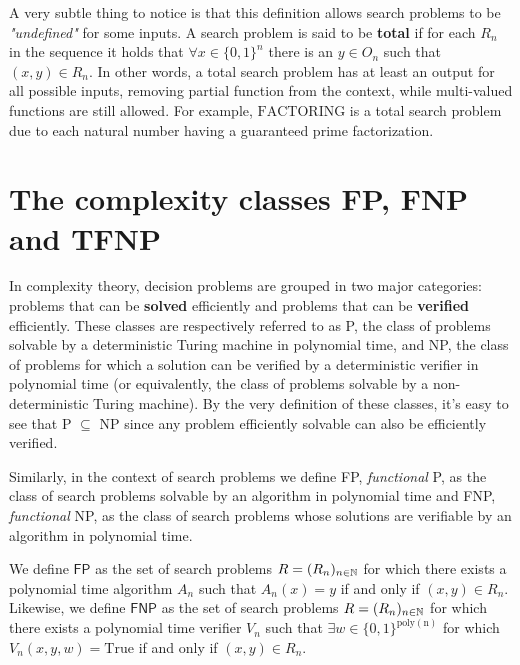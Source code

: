 A very subtle thing to notice is that this definition allows search problems to be \textit{"undefined"} for some inputs. A search problem is said to be \textbf{total} if for each $R_n$ in the sequence it holds that $\forall x \in \{0,1\}^n$ there is an $y \in O_n$ such that $(x,y) \in R_n$. In other words, a total search problem has at least an output for all possible inputs, removing partial function from the context, while multi-valued functions are still allowed. For example, $\mathrm{FACTORING}$ is a total search problem due to each natural number having a guaranteed prime factorization.

\newpage

\section{The complexity classes \textsf{FP}, \textsf{FNP} and \textsf{TFNP}}

In complexity theory, decision problems are grouped in two major categories: problems that can be \textbf{solved} efficiently and problems that can be \textbf{verified} efficiently. These classes are respectively referred to as \textsf{P}, the class of problems solvable by a deterministic Turing machine in polynomial time, and \textsf{NP}, the class of problems for which a solution can be  verified  by a deterministic verifier in polynomial time (or equivalently, the class of problems solvable by a non-deterministic Turing machine). By the very definition of these classes, it's easy to see that \textsf{P} $\subseteq$ \textsf{NP} since any problem efficiently solvable can also be efficiently verified.

Similarly, in the context of search problems we define \textsf{FP}, \textit{functional} \textsf{P}, as the class of search problems solvable by an algorithm in polynomial time and \textsf{FNP}, \textit{functional} \textsf{NP}, as the class of search problems whose solutions are verifiable by an algorithm in polynomial time. 

\begin{definition}
    We define $\mathsf{FP}$ as the set of search problems $R = (R_n)_{n \in \mathbb{N}}$ for which there exists a polynomial time algorithm $A_n$ such that $A_n(x) = y$ if and only if $(x,y) \in R_n$. Likewise, we define $\mathsf{FNP}$ as the set of search problems $R = (R_n)_{n \in \mathbb{N}}$ for which there exists a polynomial time verifier $V_n$ such that $\exists w \in \{0,1\}^{\mathrm{poly(n)}}$ for which $V_n(x,y,w) = \mathrm{True}$ if and only if $(x,y) \in R_n$. 
\end{definition}

